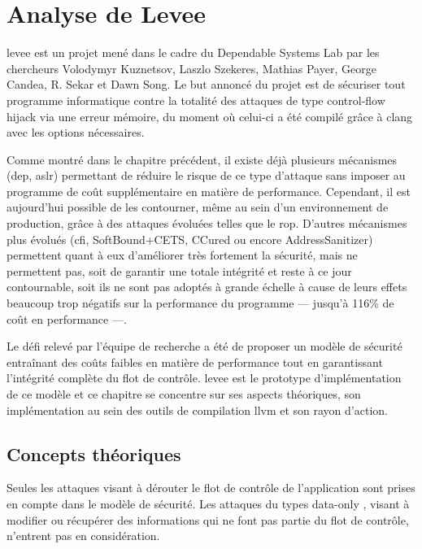 \chapter{Analyse de Levee}
\label{chap:levee}


\gls{levee} est un projet mené dans le cadre du Dependable Systems Lab \cite{dslab} par les chercheurs Volodymyr Kuznetsov, Laszlo Szekeres, Mathias Payer, George Candea, R. Sekar et Dawn Song. Le but annoncé du projet est de sécuriser tout programme informatique contre la totalité des attaques de type \og control-flow hijack \fg via une erreur mémoire, du moment où celui-ci a été compilé grâce à \gls{clang} avec les options nécessaires.

Comme montré dans le chapitre précédent, il existe déjà plusieurs mécanismes (\gls{dep}, \gls{aslr}) permettant de réduire le risque de ce type d'attaque sans imposer au programme de coût supplémentaire en matière de performance. Cependant, il est aujourd'hui possible de les contourner, même au sein d'un environnement de production, grâce à des attaques évoluées telles que le \gls{rop}. D'autres mécanismes plus évolués (\gls{cfi}, SoftBound+CETS, CCured ou encore AddressSanitizer) permettent quant à eux d'améliorer très fortement la sécurité, mais ne permettent pas, soit de garantir une totale intégrité et reste à ce jour contournable, soit ils ne sont pas adoptés à grande échelle à cause de leurs effets beaucoup trop négatifs sur la performance du programme --- jusqu'à 116\% de coût en performance ---.

Le défi relevé par l'équipe de recherche a été de proposer un modèle de sécurité entraînant des coûts faibles en matière de performance tout en garantissant l'intégrité complète du flot de contrôle. \gls{levee} est le prototype d'implémentation de ce modèle et ce chapitre se concentre sur ses aspects théoriques, son implémentation au sein des outils de compilation \gls{llvm} et son rayon d'action.

\minitoc

\newpage

\section{Concepts théoriques}

Seules les attaques visant à dérouter le flot de contrôle de l'application sont prises en compte dans le modèle de sécurité. Les attaques du types \og data-only \fg, visant à modifier ou récupérer des informations qui ne font pas partie du flot de contrôle, n'entrent pas en considération.

